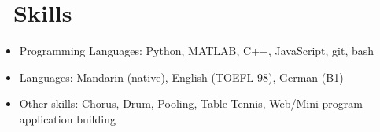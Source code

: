 \documentclass{resume}
\begin{document}


\section{\faCogs\ Skills}

\begin{itemize}[parsep=0.5ex]
  \item Programming Languages: Python, MATLAB, C++, JavaScript, git, bash
  \item Languages: Mandarin (native), English (TOEFL 98), German (B1)
  \item Other skills: Chorus, Drum, Pooling, Table Tennis, Web/Mini-program application building
\end{itemize}

\end{document}

